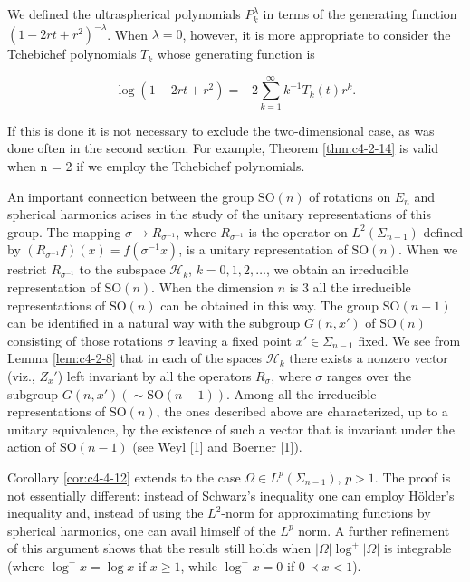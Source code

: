  We defined the ultraspherical polynomials $P_k^\lambda$ in terms of the generating function $(1 - 2rt + r^2)^{-\lambda}$. When $\lambda = 0$, however, it is more appropriate to consider the Tchebichef polynomials $T_k$ whose generating function is

\[
\log\left(1-2r t+r^{2}\right)=-2\sum_{k=1}^{\infty}k^{-1}T_{k}(t)r^{k}.
\]

If this is done it is not necessary to exclude the two-dimensional case, as was done often in the second section. For example, Theorem \ref{thm:c4-2-14} is valid when n = 2 if we employ the Tchebichef polynomials.

 An important connection between the group $\mathrm{SO}(n)$ of rotations on $E_n$ and spherical harmonics arises in the study of the unitary representations of this group. The mapping $\sigma \to R_{\sigma^{-1}}$, where $R_{\sigma^{-1}}$ is the operator on $L^2(\Sigma_{n-1})$ defined by $(R_{\sigma^{-1}}f)(x) = f(\sigma^{-1}x)$, is a unitary representation of $\mathrm{SO}(n)$. When we restrict $R_{\sigma^{-1}}$ to the subspace $\mathcal{H}_k$, $k = 0, 1, 2, \ldots$, we obtain an irreducible representation of $\mathrm{SO}(n)$. When the dimension $n$ is 3 all the irreducible representations of $\mathrm{SO}(n)$ can be obtained in this way. The group $\mathrm{SO}(n-1)$ can be identified in a natural way with the subgroup $G(n, x')$ of $\mathrm{SO}(n)$ consisting of those rotations $\sigma$ leaving a fixed point $x' \in \Sigma_{n-1}$ fixed. We see from Lemma \ref{lem:c4-2-8} that in each of the spaces $\mathcal{H}_k$ there exists a nonzero vector (viz., $Z_x'$) left invariant by all the operators $R_\sigma$, where $\sigma$ ranges over the subgroup $G(n, x')(\sim \mathrm{SO}(n-1))$. Among all the irreducible representations of $\mathrm{SO}(n)$, the ones described above are characterized, up to a unitary equivalence, by the existence of such a vector that is invariant under the action of $\mathrm{SO}(n-1)$ (see Weyl [1] and Boerner [1]).

 Corollary \ref{cor:c4-4-12} extends to the case $\Omega \in L^p(\Sigma_{n-1})$, $p > 1$. The proof is not essentially different: instead of Schwarz's inequality one can employ Hölder's inequality and, instead of using the $L^2$-norm for approximating functions by spherical harmonics, one can avail himself of the $L^p$ norm. A further refinement of this argument shows that the result still holds when $|\Omega| \log^+ |\Omega|$ is integrable (where $\log^+ x = \log x$ if $x \geq 1$, while $\log^+ x = 0$ if $0 \prec x < 1$).

